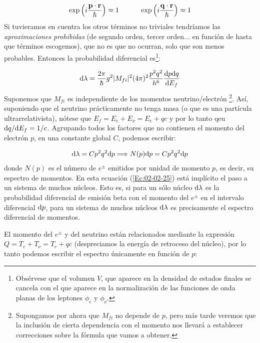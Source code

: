 \begin{eqnarray}
	\exp \left( i \frac{\mathbf{p} \cdot \mathbf{r}}{\hbar} \right) \approx 1 \quad \quad \quad \exp \left( i \frac{\mathbf{q} \cdot \mathbf{r}}{\hbar} \right) \approx 1
\end{eqnarray} 
Si tuvieramos en cuentra los otros términos no triviales tendríamos las \textit{aproximaciones prohibidas} (de segundo orden, tercer orden... en función de hasta que términos escogemos), que no es que no ocurran, solo que son menos probables. Entonces la probabilidad diferencial es\footnote{Obsérvese que el volumen $V$, que aparece en la densidad de estados finales se cancela con el que aparece en la normalización de las funciones de onda planas de los leptones $\phi_e$ y $\phi_\nu$.}:

\begin{eqnarray}
	\mathrm{d} \lambda = \frac{2\pi}{\hbar} g^2 |M_{fi}|^2 (4\pi)^2 \frac{p^2 q^2}{h^ 6} \frac{\mathrm{d} p \mathrm{d} q }{\mathrm{d} E_f} \label{Ec:02-02-24}
\end{eqnarray}
Suponemos que $M_{fi}$ es independiente de los momentos neutrino/electrón \footnote{Supongamos por ahora que $M_{fi}$ no depende de $p$, pero más tarde veremos que la inclusión de cierta dependencia con el momento nos llevará a establecer correcciones sobre la fórmula que vamos a obtener.}. Así, suponiendo que el neutrino prácticamente no tenga masa (o que es una partícula ultrarrelativista), nótese que $E_f=E_e+E_\nu=E_e+qc$ y por lo tanto qeu $\mathrm{d} q / \mathrm{d} E_f=1/c$. Agrupando todos los factores que no contienen el momento del electrón $p$, en una constante global $C$, podemos escribir:

\begin{eqnarray}
	\mathrm{d}\lambda = Cp^2 q^2 \mathrm{d} p \Longrightarrow N(p) \mathrm{d} p = Cp^2 q^2 \mathrm{d} p \label{Ec:02-02-25}
\end{eqnarray} 
donde $N(p)$ es el número de $e^{\pm}$ emitidos por unidad de momento $p$, es decir, su espectro de momentos. En esta ecuación (\ref{Ec:02-02-25}) está implícito el paso a un sistema de muchos núcleos. Esto es, si para un sólo núcleo $\mathrm{d} \lambda$ es la probabilidad diferencial de emisión beta con el momento del $e^\pm$ en el intervalo diferencial $\mathrm{d} p$, para un sistema de muchos núcleos $\mathrm{d} \lambda$ es precisamente el espectro diferencial de momentos.

El momento del $e^{\pm}$ y del neutrino están relacionados mediante la expresión $Q=T_e+T_\nu=T_e+qc$ (despreciamos la energía de retroceso del núcleo), por lo tanto podemos escribir el espectro únicamente en función de $p$:

